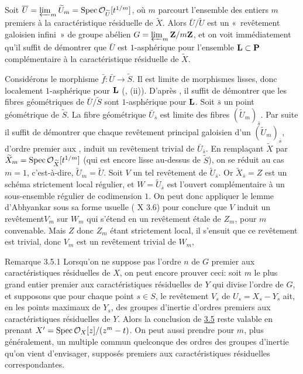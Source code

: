 \documentclass[10pt]{../fichiers-configuration-latex/smfart}
\begin{document}
Soit
$\overline{U}=\varprojlim_m\widetilde{U}_{m}=\operatorname{Spec} {\mathcal O}_{\widetilde{U}}[t^{1/m}]$,
où $m$ parcourt l'ensemble des entiers $m$ premiers à la
caractéristique résiduelle de $\widetilde{X}$. Alors
$\bar{U}/\widetilde{U}$ est un « revêtement galoisien infini »  de
groupe abélien $G=\varprojlim_m \mathbf{Z}/m\mathbf{Z}$, et on voit
immédiatement qu'il suffit de démontrer que $\bar{U}$ est
$1$-asphérique pour l'ensemble $\mathbf{L}\subset \mathbf{P}$
complémentaire à la caractéristique résiduelle de $\widetilde{X}$.

Considérons le morphisme $\bar{f}:\bar{U}\rightarrow
\widetilde{S}$. Il est limite de morphismes lisses, donc localement
$1$-asphérique pour $\mathbf{L}$ (, 
(ii)). D'après , il suffit de démontrer que les fibres
géométriques de $\bar{U}/\widetilde{S}$ sont $1$-asphérique pour
$\mathbf{L}$. Soit $\bar{s}$ un point géométrique de $\widetilde{S}$. La
fibre géométrique $\bar{U}_{\bar{s}}$ est limite des fibres
$(\widetilde{U}_m)_{\bar{s}}$. Par suite il suffit de démontrer que
chaque revêtement principal galoisien d'un
$(\widetilde{U}_m)_{\bar{s}}$, d'ordre premier aux ,
induit un revêtement trivial de $\bar{U}_{\bar{s}}$. En remplaçant
$\widetilde{X}$ par
$\widetilde{X}_m=\operatorname{Spec} {\mathcal O}_{\widetilde{X}}[t^{1/m}]$ (qui est
encore lisse au-dessus de $\widetilde{S}$), on se réduit au cas $m=1$,
c'est-à-dire, $\widetilde{U}_m=\widetilde{U}$. Soit $V$ un tel revêtement de
$\widetilde{U}_{\bar{s}}$. Or $\widetilde{X}_{\bar{s}}=Z$ est un
schéma strictement local régulier, et $W=\widetilde{U}_{\bar{s}}$ est
l'ouvert complémentaire à un sous-ensemble régulier de codimension
$1$. On peut donc appliquer le lemme d'Abhyankar sous sa forme usuelle
( X 3.6) pour conclure que $V$ induit un
revêtement\pageoriginale $V_m$ sur $W_m$ qui s'étend en un revêtement
étale de $Z_m$, pour $m$ convenable. Mais $Z$ donc $Z_m$ étant
strictement local, il s'ensuit que ce revêtement est trivial, donc
$V_m$ est un revêtement trivial de $W_m$, \cqfd

\begin{enonce*}[remark]{Remarque 3.5.1}
Lorsqu'on ne suppose pas l'ordre $n$ de $G$ premier aux
caractéristiques résiduelles de $X$, on peut encore prouver ceci: soit
$m$ le plus grand entier premier aux caractéristiques résiduelles de
$Y$ qui divise l'ordre de $G$, et supposons que pour chaque point
$s\in S$, le revêtement $V_s$ de $U_s=X_s-Y_s$ ait, en les points
maximaux de $Y_s$, des groupes d'inertie d'ordres premiers aux
caractéristiques résiduelles de $Y$. Alors la conclusion de \hyperref[XVI.lem3.5]{3.5} reste
valable en prenant $X'=\operatorname{Spec} {\mathcal O}_X[z]/(z^m-t)$. On peut aussi
prendre pour $m$, plus généralement, un multiple commun quelconque des
ordres des groupes d'inertie qu'on vient d'envisager, supposés
premiers aux caractéristiques résiduelles correspondantes.
\end{enonce*}
\end{document}
